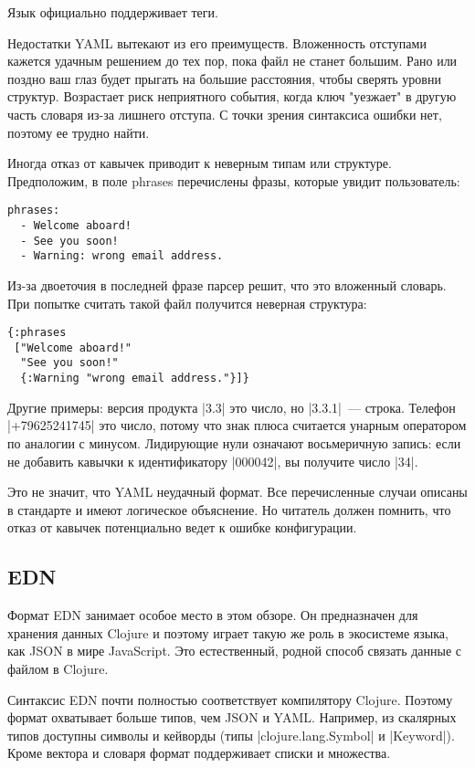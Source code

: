 Язык официально поддерживает теги.

Недостатки YAML вытекают из его преимуществ. Вложенность отступами кажется
удачным решением до тех пор, пока файл не станет большим. Рано или поздно ваш
глаз будет прыгать на большие расстояния, чтобы сверять уровни
структур. Возрастает риск неприятного события, когда ключ "уезжает" в другую
часть словаря из-за лишнего отступа. С точки зрения синтаксиса ошибки нет,
поэтому ее трудно найти.

Иногда отказ от кавычек приводит к неверным типам или структуре. Предположим, в
поле phrases перечислены фразы, которые увидит пользователь:

\begin{verbatim}
phrases:
  - Welcome aboard!
  - See you soon!
  - Warning: wrong email address.
\end{verbatim}

Из-за двоеточия в последней фразе парсер решит, что это вложенный словарь. При
попытке считать такой файл получится неверная структура:

\begin{verbatim}
{:phrases
 ["Welcome aboard!"
  "See you soon!"
  {:Warning "wrong email address."}]}
\end{verbatim}

Другие примеры: версия продукта \spverb|3.3| это число, но \spverb|3.3.1|~--- строка. Телефон
\spverb|+79625241745| это число, потому что знак плюса считается унарным оператором по
аналогии с минусом. Лидирующие нули означают восьмеричную запись: если не
добавить кавычки к идентификатору \spverb|000042|, вы получите число \spverb|34|.

Это не значит, что YAML неудачный формат. Все перечисленные случаи описаны в
стандарте и имеют логическое объяснение. Но читатель должен помнить, что отказ
от кавычек потенциально ведет к ошибке конфигурации.

\subsection{EDN}

Формат EDN занимает особое место в этом обзоре. Он предназначен для хранения
данных Clojure и поэтому играет такую же роль в экосистеме языка, как JSON в
мире JavaScript. Это естественный, родной способ связать данные с файлом в
Clojure.

Синтаксис EDN почти полностью соответствует компилятору Clojure. Поэтому формат
охватывает больше типов, чем JSON и YAML. Например, из скалярных типов доступны
символы и кейворды (типы \spverb|clojure.lang.Symbol| и \spverb|Keyword|). Кроме вектора и
словаря формат поддерживает списки и множества.

